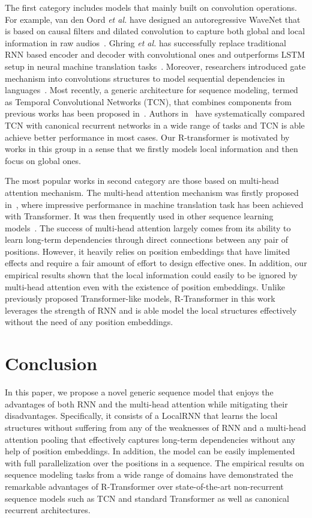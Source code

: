 \documentclass{article} \usepackage{iclr2019_conference,times}
\begin{document}
The first category includes models that mainly built on convolution operations. For example, van den Oord {\it et al.} have designed an autoregressive WaveNet that is based on causal filters and dilated convolution to capture both global and local information in raw audios~\citep{van2016wavenet}. Ghring {\it et al.} has successfully replace traditional RNN based encoder and decoder with convolutional ones and outperforms LSTM setup in neural machine translation tasks~\citep{gehring2017convolutional,gehring2016convolutional}. Moreover, researchers introduced gate mechanism into convolutions structures to model sequential dependencies in languages~\citep{dauphin2017language}. Most recently, a generic architecture  for sequence modeling, termed as Temporal Convolutional Networks (TCN), that combines components from previous works has been proposed in~\citep{bai2018empirical}. Authors in~\citep{bai2018empirical} have systematically compared TCN with canonical recurrent networks in a wide range of tasks and TCN is able achieve better performance in most cases. Our R-transformer is motivated by works in this group in a sense that we firstly models local information and then focus on global ones.

The most popular works in second category are those based on multi-head attention mechanism. The multi-head attention mechanism was firstly proposed in~\citet{vaswani2017attention}, where impressive performance in machine translation task has been achieved with Transformer. It was then frequently used in other sequence learning models~\citep{devlin2018bert,dehghani2018universal,dai2019transformer}. The success of multi-head attention largely comes from its ability to learn long-term dependencies through direct connections between any pair of positions. However, it heavily relies on position embeddings that have limited effects and require a fair amount of effort to design effective ones. In addition, our empirical results shown that the local information could easily to be ignored by multi-head attention even with the existence of position embeddings. Unlike previously proposed Transformer-like models, R-Transformer in this work leverages the strength of RNN and is able model the local structures effectively without the need of any position embeddings.  \section{Conclusion}
In this paper, we propose a novel generic sequence model that enjoys the advantages of both RNN and the multi-head attention while mitigating their disadvantages. Specifically, it consists of a LocalRNN that learns the local structures without suffering from any of the weaknesses of RNN and a multi-head attention pooling that effectively captures long-term dependencies without any help of position embeddings. In addition, the model can be easily implemented with full parallelization over the positions in a sequence. The empirical results on sequence modeling tasks from a wide range of domains have demonstrated the remarkable advantages of R-Transformer over state-of-the-art non-recurrent sequence models such as TCN and standard Transformer as well as canonical recurrent architectures. 


\end{document}
